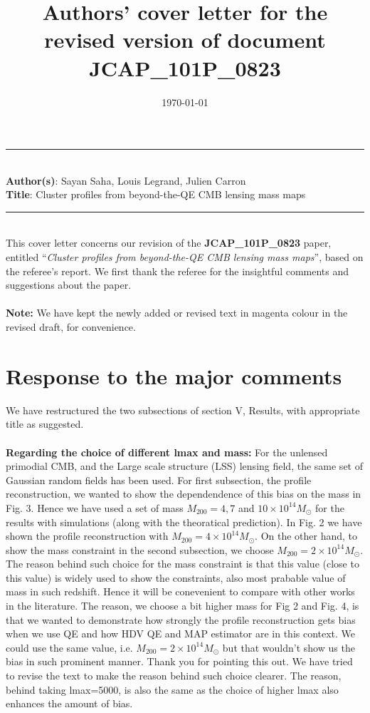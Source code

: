 \documentclass[10pt]{article}
\title{Authors' cover letter for the revised version of document \textbf{JCAP\_101P\_0823} \\
	\vspace{-4ex}}
\date{\today}
\begin{document}
	\noindent\rule{18cm}{1pt}\\
	\textbf{Author(s)}: Sayan Saha, Louis Legrand, Julien Carron\\
	\textbf{Title}: Cluster profiles from  beyond-the-QE CMB lensing mass maps\\
	\noindent\rule{18cm}{1pt}\\
	
	This cover letter concerns our revision of the \textbf{JCAP\_101P\_0823} paper,
	entitled ``\textit{Cluster profiles from  beyond-the-QE CMB lensing mass maps}'', based on the referee's report. We first thank the referee for the insightful comments and suggestions about the paper. \\
	\\
	\textbf{Note:} We have kept the newly added or revised text in magenta colour in the revised draft, for convenience.
	
	\section{Response to the major comments}
	
	We have restructured the two subsections of section V, Results, with appropriate title as suggested. \\
	\\
	\textbf{Regarding the choice of different lmax and mass:} For the unlensed primodial CMB, and the Large scale structure (LSS) lensing field, the same set of Gaussian random fields has been used. For first subsection, the profile reconstruction, we wanted to show the dependendence of this bias on the mass in Fig. 3. Hence we have used a set of mass $M_{200}=4, 7$ and $10\times 10^{14} M_\odot$ for the results with simulations (along with the theoratical prediction).  In Fig. 2 we have shown the profile reconstruction with $M_{200}  = 4\times 10^{14} M_{\odot}$. On the other hand, to show the mass constraint in the second subsection, we choose $M_{200}=2\times 10^{14} M_{\odot}$. The reason behind such choice for the mass constraint is that this value (close to this value) is widely used to show the constraints, also most prabable value of mass in such redshift. Hence it will be conevenient to compare with other works in the literature. The reason, we choose a bit higher mass for Fig 2 and Fig. 4, is that we wanted to demonstrate how strongly the profile reconstruction gets bias when we use QE and how HDV QE and MAP estimator are in this context. We could use the same value, i.e. $M_{200}=2\times 10^{14} M_{\odot}$ but that wouldn't show us the bias in such prominent manner. Thank you for pointing this out. We have tried to revise the text to make the reason behind such choice clearer. The reason, behind taking lmax=5000, is also the same as the choice of higher lmax also enhances the amount of bias.    
\end{document}
